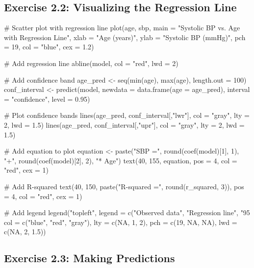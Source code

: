 \documentclass[11pt]{article}
\begin{document}
\subsection{Exercise 2.2: Visualizing the Regression Line}

\begin{rcode}
# Scatter plot with regression line
plot(age, sbp,
     main = "Systolic BP vs. Age with Regression Line",
     xlab = "Age (years)",
     ylab = "Systolic BP (mmHg)",
     pch = 19,
     col = "blue",
     cex = 1.2)

# Add regression line
abline(model, col = "red", lwd = 2)

# Add confidence band
age_pred <- seq(min(age), max(age), length.out = 100)
conf_interval <- predict(model,
                         newdata = data.frame(age = age_pred),
                         interval = "confidence",
                         level = 0.95)

# Plot confidence bands
lines(age_pred, conf_interval[,"lwr"], col = "gray", lty = 2, lwd = 1.5)
lines(age_pred, conf_interval[,"upr"], col = "gray", lty = 2, lwd = 1.5)

# Add equation to plot
equation <- paste("SBP =", round(coef(model)[1], 1), "+",
                  round(coef(model)[2], 2), "* Age")
text(40, 155, equation, pos = 4, col = "red", cex = 1)

# Add R-squared
text(40, 150, paste("R-squared =", round(r_squared, 3)),
     pos = 4, col = "red", cex = 1)

# Add legend
legend("topleft",
       legend = c("Observed data", "Regression line", "95%
       col = c("blue", "red", "gray"),
       lty = c(NA, 1, 2),
       pch = c(19, NA, NA),
       lwd = c(NA, 2, 1.5))
\end{rcode}

\subsection{Exercise 2.3: Making Predictions}
\end{document}

